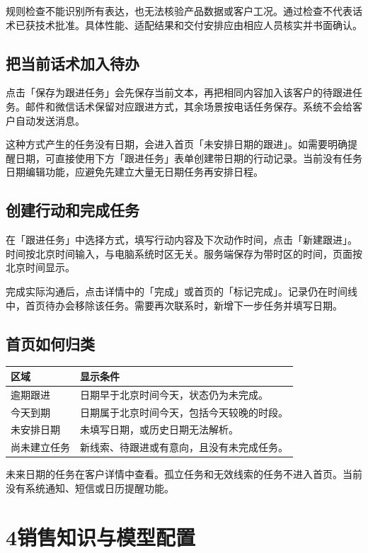 \documentclass[UTF8,fontset=fandol,zihao=5,a4paper]{ctexart}
\begin{document}
规则检查不能识别所有表达，也无法核验产品数据或客户工况。通过检查不代表话术已获技术批准。具体性能、适配结果和交付安排应由相应人员核实并书面确认。

\subsection*{把当前话术加入待办}
点击「保存为跟进任务」会先保存当前文本，再把相同内容加入该客户的待跟进任务。邮件和微信话术保留对应跟进方式，其余场景按电话任务保存。系统不会给客户自动发送消息。

这种方式产生的任务没有日期，会进入首页「未安排日期的跟进」。如需要明确提醒日期，可直接使用下方「跟进任务」表单创建带日期的行动记录。当前没有任务日期编辑功能，应避免先建立大量无日期任务再安排日程。

\subsection*{创建行动和完成任务}
在「跟进任务」中选择方式，填写行动内容及下次动作时间，点击「新建跟进」。时间按北京时间输入，与电脑系统时区无关。服务端保存为带时区的时间，页面按北京时间显示。

完成实际沟通后，点击详情中的「完成」或首页的「标记完成」。记录仍在时间线中，首页待办会移除该任务。需要再次联系时，新增下一步任务并填写日期。

\subsection*{首页如何归类}
\par\noindent
\begin{tabularx}{\linewidth}{@{}lY@{}}
\toprule
区域 & 显示条件 \\
\midrule
逾期跟进 & 日期早于北京时间今天，状态仍为未完成。\\
今天到期 & 日期属于北京时间今天，包括今天较晚的时段。\\
未安排日期 & 未填写日期，或历史日期无法解析。\\
尚未建立任务 & 新线索、待跟进或有意向，且没有未完成任务。\\
\bottomrule
\end{tabularx}
\par
未来日期的任务在客户详情中查看。孤立任务和无效线索的任务不进入首页。当前没有系统通知、短信或日历提醒功能。

\newpage
\section*{4\quad 销售知识与模型配置}
\end{document}
